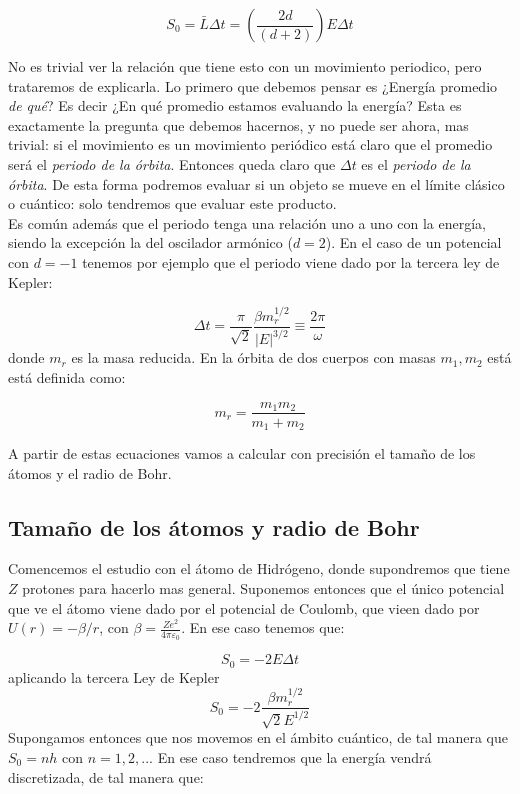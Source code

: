 \documentclass[12pt]{article}
\newcommand{\parentesis}[1]{\left( #1  \right)}
\begin{document}
\begin{equation}
S_0 = \bar{L} \Delta t = \parentesis{ \dfrac{2d}{(d+2)}} E \Delta t \label{Ec:03.4}
\end{equation}

No es trivial ver la relación que tiene esto con un movimiento periodico, pero trataremos de explicarla. Lo primero que debemos pensar es ¿Energía promedio \textit{de qué}? Es decir ¿En qué promedio estamos evaluando la energía? Esta es exactamente la pregunta que debemos hacernos, y no puede ser ahora, mas trivial: si el movimiento es un movimiento periódico está claro que el promedio será el \textit{periodo de la órbita}. Entonces queda claro que $\Delta t$ es el \textit{periodo de la órbita}. De esta forma podremos evaluar si un objeto se mueve en el límite clásico o cuántico: solo tendremos que evaluar este producto. \\

Es común además que el periodo tenga una relación uno a uno con la energía, siendo la excepción la del oscilador armónico ($d=2$). En el caso de un potencial con $d=-1$ tenemos por ejemplo que el periodo viene dado por la tercera ley de Kepler:

\begin{equation} 
\Delta t = \dfrac{\pi}{\sqrt{2}} \dfrac{\beta m_r^{1/2}}{|E|^{3/2}} \equiv \dfrac{2 \pi}{\omega}
\end{equation}
donde $m_r$ es la masa reducida. En la órbita de dos cuerpos con masas $m_1,m_2$ está está definida como:

\begin{equation}
m_r = \dfrac{m_1 m_2}{m_1 + m_2}
\end{equation}

A partir de estas ecuaciones vamos a calcular con precisión el tamaño de los átomos y el radio de Bohr. 

\subsection{Tamaño de los átomos y radio de Bohr}

Comencemos el estudio con el átomo de Hidrógeno, donde supondremos que tiene $Z$ protones para hacerlo mas general. Suponemos entonces que el único potencial que ve el átomo viene dado por el potencial de Coulomb, que vieen dado por $U(r) = - \beta /r$, con $\beta = \frac{Ze^2}{4 \pi \varepsilon_0}$. En ese caso tenemos que:

$$ S_0 = - 2 E \Delta t $$
aplicando la tercera Ley de Kepler
$$ S_0 = - 2 \dfrac{\beta m_r^{1/2}}{\sqrt{2} E^{1/2}} $$
Supongamos entonces que nos movemos en el ámbito cuántico, de tal manera que $S_0 = n h $ con $n=1,2,...$ En ese caso tendremos que la energía vendrá discretizada, de tal manera que:
\end{document}
